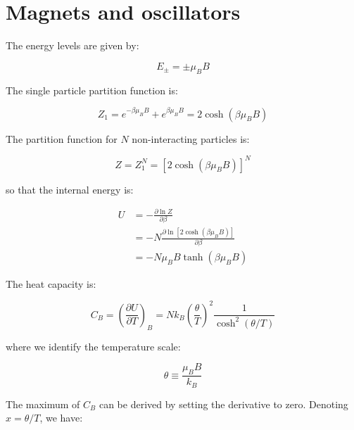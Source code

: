 \documentclass[12pt]{article}
\begin{document}



\pagebreak
\section*{Magnets and oscillators}



The energy levels are given by:

\begin{equation}
    E_{\pm} = \pm \mu_{B} B
\end{equation}

The single particle partition function is:

\begin{equation}
    Z_{1} = e^{-\beta \mu_{B} B} + e^{\beta \mu_{B} B} = 2 \cosh{(\beta \mu_{B} B)}
\end{equation}

The partition function for $N$ non-interacting particles is:

\begin{equation}
    Z = Z_{1}^{N} = [2 \cosh{(\beta \mu_{B} B)}]^{N}
\end{equation}

so that the internal energy is:

\begin{equation}
    \begin{split}
        U &= -\frac{\partial \ln{Z}}{\partial \beta} \\
        &= -N \frac{\partial \ln{[2 \cosh{(\beta \mu_{B} B)}]}}{\partial \beta} \\
        &= -N \mu_{B} B \tanh{(\beta \mu_{B} B)}
    \end{split}
\end{equation}

The heat capacity is:

\begin{equation}
    C_{B} = \left( \frac{\partial U}{\partial T} \right)_{B} = N k_{B} \left( \frac{\theta}{T} \right)^{2} \frac{1}{\cosh^{2}{(\theta/T)}}
\end{equation}

where we identify the temperature scale:

\begin{equation}
    \theta \equiv \frac{\mu_{B} B}{k_{B}}
\end{equation}

The maximum of $C_{B}$ can be derived by setting the derivative to zero. Denoting $x = \theta/T$, we have:
\end{document}
